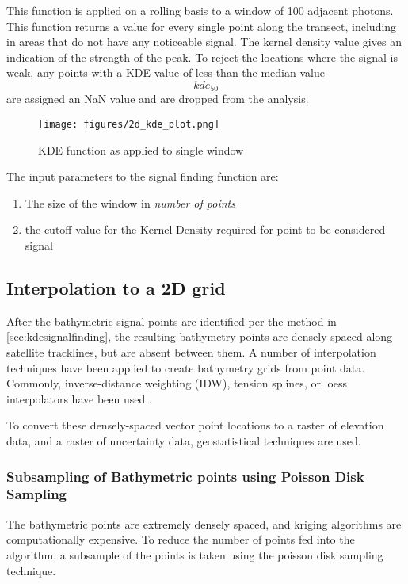 This function is applied on a rolling basis to a window of 100 adjacent photons. This function returns a value for every single point along the transect, including in areas that do not have any noticeable signal. The kernel density value gives an indication of the strength of the peak. To reject the locations where the signal is weak, any points with a KDE value of less than the median value $$ kde_{50} $$  are assigned an NaN value and are dropped from the analysis.

\begin{figure}[htbp]
    \centering
    \texttt{[image: figures/2d\_kde\_plot.png]}
    \caption{KDE function as applied to single window}
    \label{fig:kdefunc}
\end{figure}

The input parameters to the signal finding function are:

\begin{enumerate}
    \item The size of the window in \emph{number of points}
    \item the cutoff value for the Kernel Density required for point to be considered signal
\end{enumerate}

\subsection{Interpolation to a 2D grid}

After the bathymetric signal points are identified per the method in \ref{sec:kdesignalfinding}, the resulting bathymetry points are densely spaced along satellite tracklines, but are absent between them. A number of interpolation techniques have been applied to create bathymetry grids from point data. Commonly, inverse-distance weighting (IDW), tension splines, or loess interpolators have been used \parencite{gebcocookbook,Ferreira2017,}.

To convert these densely-spaced vector point locations to a raster of elevation data, and a raster of uncertainty data, geostatistical techniques are used.



\subsubsection{Subsampling of Bathymetric points using Poisson Disk Sampling} \label{subsec:poissonsubsampling}
The bathymetric points are extremely densely spaced, and kriging algorithms are computationally expensive. To reduce the number of points fed into the algorithm, a subsample of the points is taken using the poisson disk sampling technique. 

